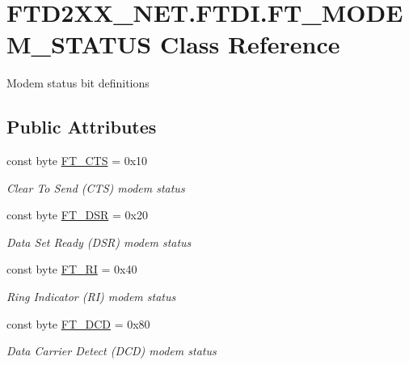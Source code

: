 \hypertarget{class_f_t_d2_x_x___n_e_t_1_1_f_t_d_i_1_1_f_t___m_o_d_e_m___s_t_a_t_u_s}{}\section{F\+T\+D2\+X\+X\+\_\+\+N\+E\+T.\+F\+T\+D\+I.\+F\+T\+\_\+\+M\+O\+D\+E\+M\+\_\+\+S\+T\+A\+T\+US Class Reference}
\label{class_f_t_d2_x_x___n_e_t_1_1_f_t_d_i_1_1_f_t___m_o_d_e_m___s_t_a_t_u_s}


Modem status bit definitions  


\subsection*{Public Attributes}
\begin{DoxyCompactItemize}
\item 
const byte \mbox{\hyperlink{class_f_t_d2_x_x___n_e_t_1_1_f_t_d_i_1_1_f_t___m_o_d_e_m___s_t_a_t_u_s_af2cceb330736b66e2a4f727ad8ac77e2}{F\+T\+\_\+\+C\+TS}} = 0x10
\begin{DoxyCompactList}\small\item\em Clear To Send (C\+TS) modem status \end{DoxyCompactList}\item 
const byte \mbox{\hyperlink{class_f_t_d2_x_x___n_e_t_1_1_f_t_d_i_1_1_f_t___m_o_d_e_m___s_t_a_t_u_s_af9f81fb0e0a5785bd923d45da2b96196}{F\+T\+\_\+\+D\+SR}} = 0x20
\begin{DoxyCompactList}\small\item\em Data Set Ready (D\+SR) modem status \end{DoxyCompactList}\item 
const byte \mbox{\hyperlink{class_f_t_d2_x_x___n_e_t_1_1_f_t_d_i_1_1_f_t___m_o_d_e_m___s_t_a_t_u_s_af018ccc5ca1d110530a865757a14a784}{F\+T\+\_\+\+RI}} = 0x40
\begin{DoxyCompactList}\small\item\em Ring Indicator (RI) modem status \end{DoxyCompactList}\item 
const byte \mbox{\hyperlink{class_f_t_d2_x_x___n_e_t_1_1_f_t_d_i_1_1_f_t___m_o_d_e_m___s_t_a_t_u_s_a4ee768933468b17a96c4f733ddbaff87}{F\+T\+\_\+\+D\+CD}} = 0x80
\begin{DoxyCompactList}\small\item\em Data Carrier Detect (D\+CD) modem status \end{DoxyCompactList}\end{DoxyCompactItemize}


